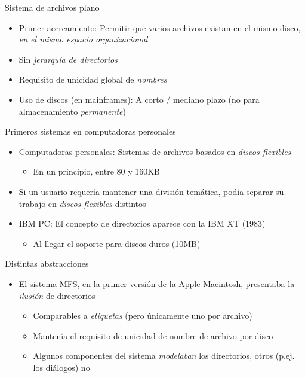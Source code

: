 \documentclass[presentation]{beamer}
\begin{document}
\begin{frame}[label={sec:org1869aa1}]{Sistema de archivos plano}
\begin{itemize}
\item Primer acercamiento: Permitir que varios archivos existan en el
mismo disco, \emph{en el mismo espacio organizacional}
\item Sin \emph{jerarquía de directorios}
\item Requisito de unicidad global de \emph{nombres}
\item Uso de discos (en mainframes): A corto / mediano plazo (no para
almacenamiento \emph{permanente})
\end{itemize}
\end{frame}

\begin{frame}[label={sec:org26f66ce}]{Primeros sistemas en computadoras personales}
\begin{itemize}
\item Computadoras personales: Sistemas de archivos basados en \emph{discos
flexibles}
\begin{itemize}
\item En un principio, entre 80 y 160KB
\end{itemize}
\item Si un usuario requería mantener una división temática, podía separar
su trabajo en \emph{discos flexibles} distintos
\item IBM PC: El concepto de directorios aparece con la IBM XT (1983)
\begin{itemize}
\item Al llegar el soporte para discos duros (10MB)
\end{itemize}
\end{itemize}
\end{frame}

\begin{frame}[label={sec:org920bbad}]{Distintas abstracciones}
\begin{itemize}
\item El sistema MFS, en la primer versión de la Apple Macintosh,
presentaba la \emph{ilusión} de directorios
\begin{itemize}
\item Comparables a \emph{etiquetas} (pero únicamente uno por archivo)
\item Mantenía el requisito de unicidad de nombre de archivo por disco
\item Algunos componentes del sistema \emph{modelaban} los directorios,
otros (p.ej. los diálogos) no
\end{itemize}
\end{itemize}
\end{frame}
\end{document}
